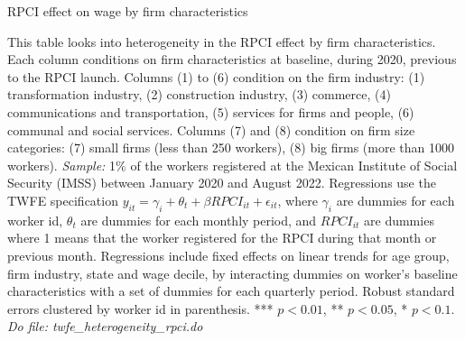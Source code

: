 \documentclass[oneside,11pt]{article}
\begin{document}
\begin{landscape}

\begin{table}[H]
    \caption{RPCI effect on wage by firm characteristics}
    \label{twfe_wage_hetero_firm_char}
    \begin{center}
    \scriptsize{}
    \end{center}
\end{table}
\scriptsize{
\noindent This table looks into heterogeneity in the RPCI effect by firm characteristics. Each column conditions on firm characteristics at baseline, during 2020, previous to the RPCI launch. Columns (1) to (6) condition on the firm industry: (1) transformation industry, (2) construction industry, (3) commerce, (4) communications and transportation, (5) services for firms and people, (6) communal and social services. Columns (7) and (8) condition on firm size categories: (7) small firms (less than 250 workers), (8) big firms (more than 1000 workers). \textit{Sample:} 1\% of the workers registered at the Mexican Institute of Social Security (IMSS) between January 2020 and August 2022. Regressions use the TWFE specification $y_{it} = \gamma_{i} + \theta_{t}+ \beta RPCI_{it} +\epsilon_{it}$, where $\gamma_{i}$ are dummies for each worker id, $\theta_{t}$ are dummies for each monthly period, and $RPCI_{it}$ are dummies where 1 means that the worker registered for the RPCI during that month or previous month. Regressions include fixed effects on linear trends for age group, firm industry, state and wage decile, by interacting dummies on worker's baseline characteristics with a set of dummies for each quarterly period. Robust standard errors clustered by worker id in parenthesis. *** $p<0.01$, ** $p<0.05$, * $p<0.1$.
\textit{Do file: twfe\_heterogeneity\_rpci.do}
}

\end{landscape}

\clearpage
\end{document}
